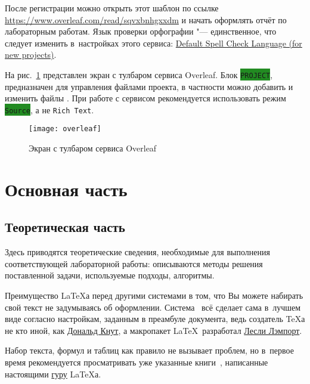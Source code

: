 После регистрации можно открыть этот шаблон по ссылке \url{https://www.overleaf.com/read/sqvxbnhgxxdm} и начать оформлять отчёт по лабораторным работам.
Язык проверки орфографии "--- единственное, что следует изменить в~настройках этого сервиса: \href{https://www.overleaf.com/users/edit#!accountsettings}{Default Spell Check Language (for new projects)}.

На рис.~\ref{fig:overleaf} представлен  экран с тулбаром сервиса Overleaf.
Блок \colorbox{ForestGreen}{\color{white}\verb"PROJECT"}, предназначен для управления файлами проекта, в частности можно добавить и изменить файлы 
.
При работе с сервисом рекомендуется использовать режим \colorbox{ForestGreen}{\color{white}\texttt{Source}}, а не
\texttt{Rich Text}.

\begin{figure}[h!]
\centering
\texttt{[image: overleaf]}

\caption{Экран с тулбаром сервиса Overleaf}
\label{fig:overleaf}
\end{figure}

\section{Основная часть}

\subsection{Теоретическая часть}

Здесь приводятся теоретические сведения, необходимые для выполнения соответствующей лабораторной работы: описываются методы решения поставленной задачи, используемые подходы, алгоритмы.

Преимущество \LaTeX{а} перед другими системами в том, что Вы можете набирать свой текст не задумываясь об оформлении. 
Система \ всё сделает сама в~лучшем виде согласно настройкам, заданным в преамбуле документа, ведь создатель \TeX{а}  не кто иной, как \href{https://ru.wikipedia.org/wiki/%D0%9A%D0%BD%D1%83%D1%82,_%D0%94%D0%BE%D0%BD%D0%B0%D0%BB%D1%8C%D0%B4_%D0%AD%D1%80%D0%B2%D0%B8%D0%BD}{Дональд Кнут}, 
а макропакет \LaTeX\ разработал \href{https://ru.wikipedia.org/wiki/%D0%9B%D1%8D%D0%BC%D0%BF%D0%BE%D1%80%D1%82,_%D0%9B%D0%B5%D1%81%D0%BB%D0%B8}{Лесли Лэмпорт}.

Набор текста, формул и таблиц как правило не вызывает проблем, но в~первое время рекомендуется просматривать уже указанные книги~\cite{latex:b1,latex:b2,latex:b3}, написанные настоящими \href{https://ru.wikipedia.org/wiki/%D0%93%D1%83%D1%80%D1%83_(%D0%B7%D0%BD%D0%B0%D1%87%D0%B5%D0%BD%D0%B8%D1%8F)}{гуру} \LaTeX{а}.

